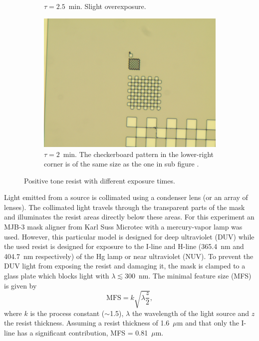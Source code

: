 \begin{figure}[!b]
\begin{subfigure}[t]{0.3\linewidth}
                    \caption{$\tau = 2.5$~min. Slight overexposure.}
                    \label{fig:b3e1}
                \end{subfigure}
                \hfill
                \begin{subfigure}[t]{0.3\linewidth}
                    \centering
                    \includegraphics[width=\textwidth]{data/b3a1.jpg}
                    \caption{$\tau = 2$~min. The checkerboard pattern in the lower-right corner is of the same size as the one in sub figure .}
                    \label{fig:b3a1}
                \end{subfigure}
                \caption{Positive tone resist with different exposure times.}
            \end{figure}
Light emitted from a source is collimated using a condenser lens (or an array of lenses). The collimated light travels through the transparent parts of the mask and illuminates the resist areas directly below these areas. For this experiment an MJB-3 mask aligner from Karl Suss Microtec with a mercury-vapor lamp was used. However, this particular model is designed for deep ultraviolet (DUV) while the used resist is designed for exposure to the I-line and H-line (365.4~nm and 404.7~nm respectively) of the Hg lamp or near ultraviolet (NUV). To prevent the DUV light from exposing the resist and damaging it, the mask is clamped to a glass plate which blocks light with $\lambda \lesssim 300$~nm. The minimal feature size (MFS) is given by
\begin{equation*}
    \text{MFS} = k\sqrt{\lambda \frac{z}{2}},
\end{equation*} where $k$ is the process constant ($\sim$1.5), $\lambda$ the wavelength of the light source and $z$ the resist thickness. Assuming a resist thickness of 1.6~$\mu$m and that only the I-line has a significant contribution, MFS = 0.81~$\mu$m.

